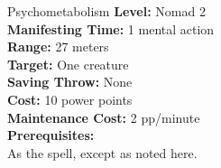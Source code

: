 {Psychometabolism}
{
	\textbf{Level:}
	Nomad 2\\
	\textbf{Manifesting Time:}
	1 mental action\\
	\textbf{Range:}
	27 meters\\
	\textbf{Target:}
	One creature\\
	\textbf{Saving Throw:}
	None\\
	\textbf{Cost:}
	10 power points\\
	\textbf{Maintenance Cost:}
	2 pp/minute\\
	\textbf{Prerequisites:}
	\\
}
{
	As the  spell, except as noted here.
}